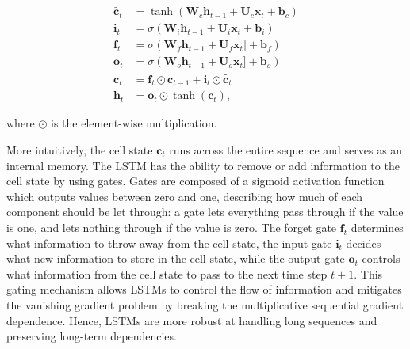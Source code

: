 \begin{equation}
\begin{aligned}
    \tilde{\bm{c}_t} &= \tanh \left( \bm{W}_c \bm{h}_{t-1} + \bm{U}_c \bm{x}_t + \bm{b}_c \right)\\
    \bm{i}_t         &= \sigma \left( \bm{W}_i \bm{h}_{t-1} + \bm{U}_i \bm{x}_t + \bm{b}_i \right) \\
    \bm{f}_t         &= \sigma \left( \bm{W}_f \bm{h}_{t-1} + \bm{U}_f \bm{x}_t] + \bm{b}_f \right) \\
    \bm{o}_t         &= \sigma \left( \bm{W}_o \bm{h}_{t-1} + \bm{U}_o \bm{x}_t] + \bm{b}_o \right) \\
    \bm{c}_t         &= \bm{f}_t \odot \bm{c}_{t-1} + \bm{i}_t \odot \tilde{\bm{c}_t} \\
    \bm{h}_t         &= \bm{o}_t \odot \tanh (\bm{c}_t),
\end{aligned}
\end{equation}

where $\odot$ is the element-wise multiplication.

More intuitively, the cell state $\bm{c}_t$ runs across the entire sequence and serves as an internal memory. The LSTM has the ability to remove or add information to the cell state by using gates. Gates are composed of a sigmoid activation function which outputs values between zero and one, describing how much of each component should be let through: a gate lets everything pass through if the value is one, and lets nothing through if the value is zero. The forget gate $\bm{f}_t$ determines what information to throw away from the cell state, the input gate $\bm{i}_t$ decides what new information to store in the cell state, while the output gate $\bm{o}_t$ controls what information from the cell state to pass to the next time step $t+1$. This gating mechanism allows \acp{LSTM} to control the flow of information and mitigates the vanishing gradient problem by breaking the multiplicative sequential gradient dependence. Hence, \acp{LSTM} are more robust at handling long sequences and preserving long-term dependencies.



